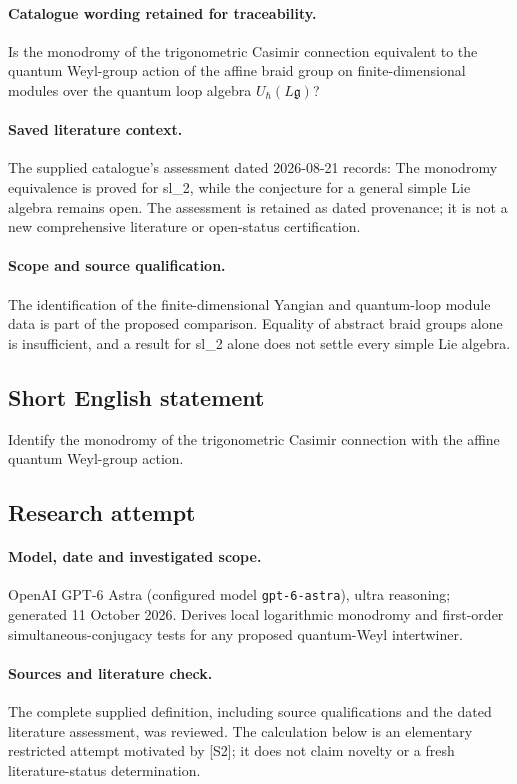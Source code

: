 \documentclass[11pt]{article}
\begin{document}
\paragraph{Catalogue wording retained for traceability.}
Is the monodromy of the trigonometric Casimir connection equivalent to the quantum Weyl-group action of the affine braid group on finite-dimensional modules over the quantum loop algebra $U_{\hbar}(L\mathfrak g)$?

\paragraph{Saved literature context.} The supplied catalogue's assessment dated 2026-08-21 records: The monodromy equivalence is proved for sl\_2, while the conjecture for a general simple Lie algebra remains open. The assessment is retained as dated provenance; it is not a new comprehensive literature or open-status certification.
\paragraph{Scope and source qualification.}The identification of the finite-dimensional Yangian and quantum-loop module data is part of the proposed comparison. Equality of abstract braid groups alone is insufficient, and a result for sl_2 alone does not settle every simple Lie algebra.
\subsection{Short English statement}
Identify the monodromy of the trigonometric Casimir connection with the affine quantum Weyl-group action.
\subsection{Research attempt}
\paragraph{Model, date and investigated scope.}
OpenAI GPT-6 Astra (configured model \texttt{gpt-6-astra}), ultra reasoning; generated 11 October 2026. Derives local logarithmic monodromy and first-order simultaneous-conjugacy tests for any proposed quantum-Weyl intertwiner.

\paragraph{Sources and literature check.}
The complete supplied definition, including source qualifications and the dated literature assessment, was reviewed. The calculation below is an elementary restricted attempt motivated by [S2]; it does not claim novelty or a fresh literature-status determination.
\end{document}
